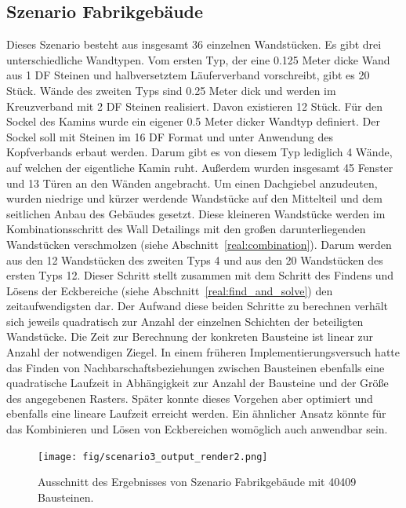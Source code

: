 \subsection{Szenario Fabrikgebäude}\label{poc:scenario3}
Dieses Szenario besteht aus insgesamt 36 einzelnen Wandstücken.
Es gibt drei unterschiedliche Wandtypen.
Vom ersten Typ, der eine 0.125 Meter dicke Wand aus 1 DF Steinen und halbversetztem Läuferverband vorschreibt, gibt es 20 Stück.
Wände des zweiten Typs sind 0.25 Meter dick und werden im Kreuzverband mit 2 DF Steinen realisiert.
Davon existieren 12 Stück.
Für den Sockel des Kamins wurde ein eigener 0.5 Meter dicker Wandtyp definiert.
Der Sockel soll mit Steinen im 16 DF Format und unter Anwendung des Kopfverbands erbaut werden.
Darum gibt es von diesem Typ lediglich 4 Wände, auf welchen der eigentliche Kamin ruht.
Außerdem wurden insgesamt 45 Fenster und 13 Türen an den Wänden angebracht.
Um einen Dachgiebel anzudeuten, wurden niedrige und kürzer werdende Wandstücke auf den Mittelteil und dem seitlichen Anbau des Gebäudes gesetzt.
Diese kleineren Wandstücke werden im Kombinationsschritt des Wall Detailings mit den großen darunterliegenden Wandstücken verschmolzen (siehe Abschnitt~\ref{real:combination}).
Darum werden aus den 12 Wandstücken des zweiten Typs 4 und aus den 20 Wandstücken des ersten Typs 12.
Dieser Schritt stellt zusammen mit dem Schritt des Findens und Lösens der Eckbereiche (siehe Abschnitt~\ref{real:find_and_solve}) den zeitaufwendigsten dar.
Der Aufwand diese beiden Schritte zu berechnen verhält sich jeweils quadratisch zur Anzahl der einzelnen Schichten der beteiligten Wandstücke.
Die Zeit zur Berechnung der konkreten Bausteine ist linear zur Anzahl der notwendigen Ziegel.
In einem früheren Implementierungsversuch hatte das Finden von Nachbarschaftsbeziehungen zwischen Bausteinen ebenfalls eine quadratische Laufzeit in Abhängigkeit zur Anzahl der Bausteine und der Größe des angegebenen Rasters.
Später konnte dieses Vorgehen aber optimiert und ebenfalls eine lineare Laufzeit erreicht werden.
Ein ähnlicher Ansatz könnte für das Kombinieren und Lösen von Eckbereichen womöglich auch anwendbar sein.

\begin{figure}[t]
  \centering
  \texttt{[image: fig/scenario3\_output\_render2.png]}
  \caption{Ausschnitt des Ergebnisses von Szenario Fabrikgebäude mit 40409 Bausteinen.}\label{fig:poc:scenario3}
\end{figure}

